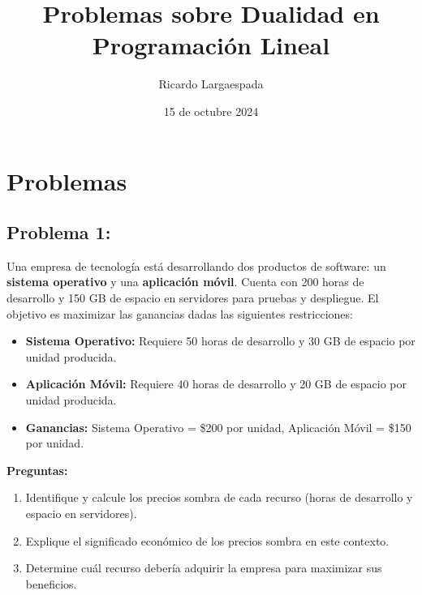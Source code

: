 \documentclass{article}
\title{Problemas sobre Dualidad en Programación Lineal}
\author{Ricardo Largaespada}
\date{15 de octubre 2024}
\begin{document}
\maketitle

\section*{Problemas}

\begin{problem}
\subsection*{Problema 1:} Una empresa de tecnología está desarrollando dos productos de software: un \textbf{sistema operativo} y una \textbf{aplicación móvil}. Cuenta con 200 horas de desarrollo y 150 GB de espacio en servidores para pruebas y despliegue. El objetivo es maximizar las ganancias dadas las siguientes restricciones:

\begin{itemize}
    \item \textbf{Sistema Operativo:} Requiere 50 horas de desarrollo y 30 GB de espacio por unidad producida.
    \item \textbf{Aplicación Móvil:} Requiere 40 horas de desarrollo y 20 GB de espacio por unidad producida.
    \item \textbf{Ganancias:} Sistema Operativo = \$200 por unidad, Aplicación Móvil = \$150 por unidad.
\end{itemize}

\textbf{Preguntas:}
\begin{enumerate}
    \item Identifique y calcule los precios sombra de cada recurso (horas de desarrollo y espacio en servidores).
    \item Explique el significado económico de los precios sombra en este contexto.
    \item Determine cuál recurso debería adquirir la empresa para maximizar sus beneficios.
\end{enumerate}

\end{problem}
\end{document}
